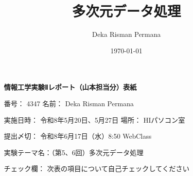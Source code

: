\documentclass[12pt,a4paper]{ltjsarticle}
\title{多次元データ処理}
\date{\today}
\author{Deka Risman Permana}
\begin{document}

\begin{titlepage}
\setlength{\parindent}{0pt}
  
\begin{center}
{\huge \textbf{情報工学実験Ⅱレポート（山本担当分）表紙}}\\[0.8cm]
\end{center}

\begin{large}
番号： 4347 名前： Deka Risman Permana\vspace{0.3cm}

実施日時： 令和8年5月20日、5月27日 場所： HIパソコン室\vspace{0.3cm}

提出〆切： 令和8年6月17日（水）8:50 WebClass\vspace{0.3cm}

実験テーマ名：（第5、6回）多次元データ処理\vspace{0.3cm}

チェック欄： 次表の項目について自己チェックしてください
\end{large}


\end{titlepage}
\end{document}
